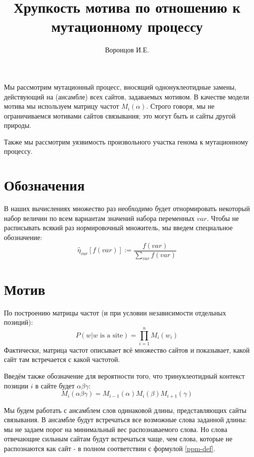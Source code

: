 \documentclass[a4paper]{article}
\begin{document}
\title{Хрупкость мотива по отношению к мутационному процессу}
\author{Воронцов И.Е.}
\maketitle
Мы рассмотрим мутационный процесс, вносящий однонуклеотидные замены, действующий на (ансамбле) всех сайтов, задаваемых мотивом. В качестве модели мотива мы используем матрицу частот $M_i(\alpha)$. Строго говоря, мы не ограничиваемся мотивами сайтов связывания; это могут быть и сайты другой природы.

Также мы рассмотрим уязвимость произвольного участка генома к мутационному процессу.

\section{Обозначения}

В наших вычислениях множество раз необходимо будет отнормировать некоторый набор величин по всем вариантам значений набора переменных $var$. Чтобы не расписывать всякий раз нормировочный множитель, мы введем специальное обозначение:
\begin{equation}
	\widehat{\eta}_{var}\left[ f(var) \right] := \frac{f(var)}{\sum_{var} f(var)}
\end{equation}

\section{Мотив}
По построению матрицы частот (и при условии независимости отдельных позиций):
\begin{equation}\label{ppm-def}
P(w | w \text{ is a site}) = \prod_{i=1}^n M_i(w_i)
\end{equation}
Фактически, матрица частот описывает всё множество сайтов и показывает, какой сайт там встречается с какой частотой.

Введём также обозначение для вероятности того, что тринуклеотидный контекст позиции $i$ в сайте будет $\alpha\beta\gamma$:
\begin{equation}
M_i(\alpha\beta\gamma) = M_{i-1}(\alpha)M_i(\beta)M_{i+1}(\gamma)
\end{equation}

Мы будем работать с ансамблем слов одинаковой длины, представляющих сайты связывания. В ансамбле будут встречаться все возможные слова заданной длины: мы не задаем порог на минимальный вес распознаваемого слова. Но слова отвечающие сильным сайтам будут встречаться чаще, чем слова, которые не распознаются как сайт - в полном соответствии с формулой \eqref{ppm-def}.
\end{document}
